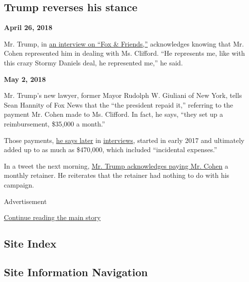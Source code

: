 \hypertarget{trump-reverses-his-stance}{%
\subsection{Trump reverses his stance}\label{trump-reverses-his-stance}}

\textbf{April 26, 2018}

Mr. Trump, in
\href{https://www.nytimes3xbfgragh.onion/2018/04/26/us/politics/trump-cohen-fox-friends.html}{an
interview on ``Fox \& Friends,''} acknowledges knowing that Mr. Cohen
represented him in dealing with Ms. Clifford. ``He represents me, like
with this crazy Stormy Daniels deal, he represented me,'' he said.

\textbf{May 2, 2018}

Mr. Trump's new lawyer, former Mayor Rudolph W. Giuliani of New York,
tells Sean Hannity of Fox News that the ``the president repaid it,''
referring to the payment Mr. Cohen made to Ms. Clifford. In fact, he
says, ``they set up a reimbursement, \$35,000 a month.''

Those payments,
\href{https://www.washingtonpost.com/world/national-security/giuliani-trump-repaid-lawyer-cohen-for-stormy-daniels-settlement/2018/05/02/526cde54-4e76-11e8-84a0-458a1aa9ac0a_story.html}{he
says later} in
\href{https://www.nytimes3xbfgragh.onion/2018/05/03/us/politics/trump-cohen-giuliani.html}{interviews},
started in early 2017 and ultimately added up to as much as \$470,000,
which included ``incidental expenses.''

In a tweet the next morning,
\href{https://www.nytimes3xbfgragh.onion/2018/05/03/us/politics/trump-cohen-giuliani.html}{Mr.
Trump acknowledges paying Mr. Cohen} a monthly retainer. He reiterates
that the retainer had nothing to do with his campaign.

Advertisement

\protect\hyperlink{after-bottom}{Continue reading the main story}

\hypertarget{site-index}{%
\subsection{Site Index}\label{site-index}}

\hypertarget{site-information-navigation}{%
\subsection{Site Information
Navigation}\label{site-information-navigation}}


